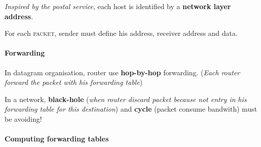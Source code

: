 \textit{Inspired by the postal service}, each host is identified by a \textbf{network layer address}.

For each \textsc{packet}, sender must define his address, receiver address and data.

\paragraph{Forwarding}
In datagram organisation, router use \textbf{hop-by-hop} forwarding. (\textit{Each router
forward the packet with his forwarding table})

In a network, \textbf{black-hole} (\textit{when router discard packet because not entry
in his forwarding table for this destination}) and \textbf{cycle} ({packet
consume bandwith}) must be avoiding!


\paragraph{Computing forwarding tables}

